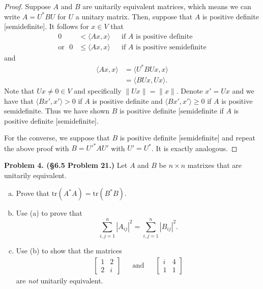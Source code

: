 \documentclass[leqno]{article}
\theoremstyle{nonumberplain}
\newtheorem{proof}{Proof}
\newcommand{\tr}{\mathrm{tr}}
\begin{document}
\begin{proof}
Suppose $A$ and $B$ are unitarily equivalent matrices, which means we can write $A=U^*BU$ for $U$ a unitary matrix.  Then, suppose that $A$ is positive definite [semidefinite].  It follows for $x\in V$ that
\begin{align*}
0&< \langle Ax,x \rangle &&\textrm{if $A$ is positive definite}\\
\textrm{or~~} 0&\leq \langle Ax,x \rangle &&\textrm{if $A$ is positive semidefinite}
\end{align*}
and
\begin{align*}
\langle Ax,x \rangle &= \langle U^* B Ux,x\rangle\\
&= \langle BUx,Ux\rangle.
\end{align*}
Note that $Ux\neq 0 \in V$ and specifically $\|Ux\|=\|x\|$. Denote $x'=Ux$ and we have that $\langle Bx',x' \rangle > 0$ if $A$ is positive definite and $\langle Bx',x' \rangle \geq 0$ if $A$ is positive semidefinite.  Thus we have shown $B$ is positive definite [semidefinite if $A$ is positive definite [semidefinite]. 

For the converse, we suppose that $B$ is positive definite [semidefinite] and repeat the above proof with $B=U'^* A U'$ with $U'=U^*$.  It is exactly analogous. 
\end{proof}

\pagebreak






\noindent\textbf{Problem 4. (\S 6.5  Problem 21.)} Let $A$ and $B$ be $n\times n$ matrixes that are unitarily equivalent.
\begin{enumerate}[(a)]
\item Prove that $\tr(A^*A)=\tr(B^*B)$.
\item Use (a) to prove that
\[
\sum_{i,j=1}^n |A_{ij}|^2 = \sum_{i,j=1}^n |B_{ij}|^2.
\]
\item Use (b) to show that the matrices
\begin{align*}
\begin{bmatrix}
1 & 2\\
2 & i
\end{bmatrix}
&& \textrm{and} &&
\begin{bmatrix}
i & 4\\
1 & 1
\end{bmatrix}
\end{align*}
are \emph{not} unitarily equivalent.
\end{enumerate}
\end{document}
